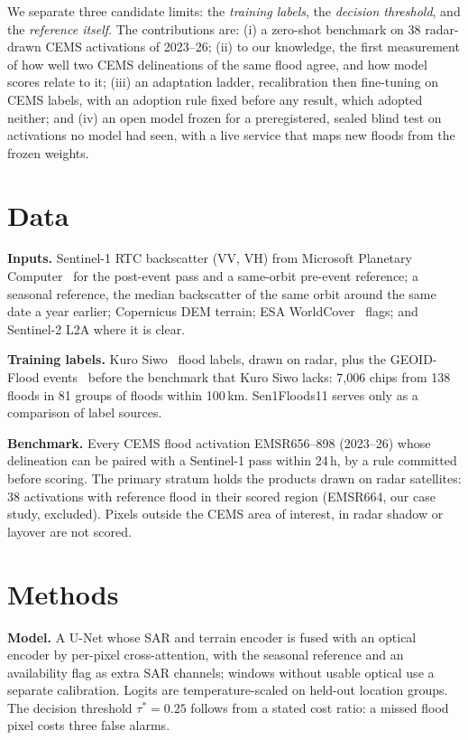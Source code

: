 \documentclass[conference]{IEEEtran}
\newcommand{\tstar}{\ensuremath{\tau^{*}}}
\begin{document}
We separate three candidate limits: the \emph{training labels}, the \emph{decision threshold}, and the
\emph{reference itself}. The contributions are:
(i) a zero-shot benchmark on 38 radar-drawn CEMS activations of 2023--26;
(ii) to our knowledge, the first measurement of how well two CEMS delineations of the same flood agree, and how
model scores relate to it;
(iii) an adaptation ladder, recalibration then fine-tuning on CEMS labels, with an adoption rule fixed before any
result, which adopted neither; and
(iv) an open model frozen for a preregistered, sealed blind test on activations no model had seen, with a live
service that maps new floods from the frozen weights.

\section{Data}
\textbf{Inputs.} Sentinel-1 RTC backscatter (VV, VH) from Microsoft Planetary Computer~\cite{planetarycomputer2022}
for the post-event pass and a same-orbit pre-event reference; a seasonal reference, the median backscatter of the
same orbit around the same date a year earlier; Copernicus DEM terrain; ESA WorldCover~\cite{zanaga2022worldcover}
flags; and Sentinel-2 L2A where it is clear.

\textbf{Training labels.} Kuro Siwo~\cite{bountos2024kurosiwo} flood labels, drawn on radar, plus the GEOID-Flood
events~\cite{chiriaco2026geoid} before the benchmark that Kuro Siwo lacks: 7,006 chips from 138 floods in 81 groups
of floods within 100\,km. Sen1Floods11 serves only as a comparison of label sources.

\textbf{Benchmark.} Every CEMS flood activation EMSR656--898 (2023--26) whose delineation can be paired with a
Sentinel-1 pass within 24\,h, by a rule committed before scoring. The primary stratum holds the products drawn on
radar satellites: 38 activations with reference flood in their scored region (EMSR664, our case study, excluded).
Pixels outside the CEMS area of interest, in radar shadow or layover are not scored.

\section{Methods}
\textbf{Model.} A U-Net whose SAR and terrain encoder is fused with an optical encoder by per-pixel cross-attention,
with the seasonal reference and an availability flag as extra SAR channels; windows without usable optical use a
separate calibration. Logits are temperature-scaled on held-out location groups. The decision threshold
$\tstar = 0.25$ follows from a stated cost ratio: a missed flood pixel costs three false alarms.
\end{document}
